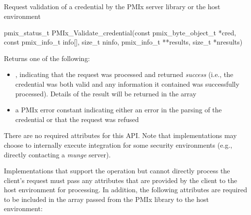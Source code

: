 \subsection{}

\summary

Request validation of a credential by the \ac{PMIx} server library or the host environment

\format

\cspecificstart
\begin{codepar}
pmix_status_t
PMIx_Validate_credential(const pmix_byte_object_t *cred,
                         const pmix_info_t info[], size_t ninfo,
                         pmix_info_t **results, size_t *nresults)
\end{codepar}
\cspecificend

\begin{arglist}
\end{arglist}

Returns one of the following:

\begin{itemize}
    \item {}, indicating that the request was processed and returned \textit{success} (i.e., the credential was both valid and any information it contained was successfully processed). Details of the result will be returned in the  array
    \item a PMIx error constant indicating either an error in the parsing of the credential or that the request was refused
\end{itemize}

\reqattrstart
There are no required attributes for this \ac{API}. Note that implementations may choose to internally
execute integration for some security environments (e.g., directly
contacting a \textit{munge} server).

Implementations that support the operation but cannot directly process the client's request must pass any attributes that are provided by the client to the host environment for processing. In addition, the following attributes are required to be included in the  array passed from the \ac{PMIx} library to the host environment:

